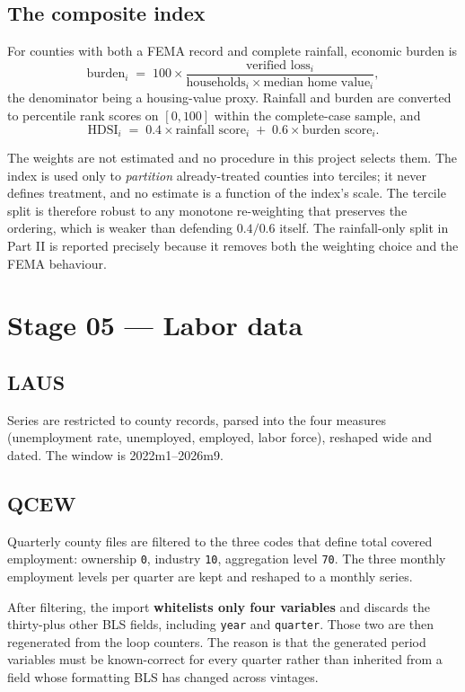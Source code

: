 \documentclass[11pt,a4paper]{article}
\newcommand{\caution}[2]{\begin{tcolorbox}[warnbox,title={#1}]#2\end{tcolorbox}}
\newcommand{\notebx}[2]{\begin{tcolorbox}[notebox,title={#1}]#2\end{tcolorbox}}
\begin{document}
\subsection{The composite index}

For counties with both a FEMA record and complete rainfall, economic burden is
\[
\text{burden}_i \;=\; 100\times\frac{\text{verified loss}_i}{\text{households}_i\times\text{median home value}_i},
\]
the denominator being a housing-value proxy. Rainfall and burden are converted
to percentile rank scores on $[0,100]$ within the complete-case sample, and
\[
\mathrm{HDSI}_i \;=\; 0.4\times\text{rainfall score}_i \;+\; 0.6\times\text{burden score}_i .
\]

\caution{The 40/60 weighting is a judgement, and the index is descriptive}{%
The weights are not estimated and no procedure in this project selects them.
The index is used only to \emph{partition} already-treated counties into
terciles; it never defines treatment, and no estimate is a function of the
index's scale. The tercile split is therefore robust to any monotone
re-weighting that preserves the ordering, which is weaker than defending
$0.4/0.6$ itself. The rainfall-only split in Part II is reported precisely
because it removes both the weighting choice and the FEMA behaviour.}

\section{Stage 05 --- Labor data}

\subsection{LAUS}

Series are restricted to county records, parsed into the four measures
(unemployment rate, unemployed, employed, labor force), reshaped wide and
dated. The window is 2022m1--2026m9.

\subsection{QCEW}

Quarterly county files are filtered to the three codes that define total
covered employment: ownership \texttt{0}, industry \texttt{10}, aggregation
level \texttt{70}. The three monthly employment levels per quarter are kept and
reshaped to a monthly series.

\notebx{A deliberate defensive step}{%
After filtering, the import \textbf{whitelists only four variables} and
discards the thirty-plus other BLS fields, including \texttt{year} and
\texttt{quarter}. Those two are then regenerated from the loop counters. The
reason is that the generated period variables must be known-correct for every
quarter rather than inherited from a field whose formatting BLS has changed
across vintages.}
\end{document}
